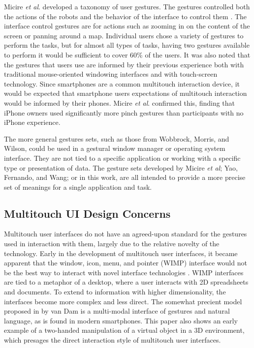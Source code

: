 Micire \textit{et al}. developed a taxonomy of user gestures. 
The gestures controlled both the actions of the robots and the behavior of the interface to control them \citep{Micire:2009:ANG:1731903.1731912}. 
The interface control gestures are for actions such as zooming in on the content of the screen or panning around a map. 
Individual users chose a variety of gestures to perform the tasks, but for almost all types of tasks, having two gestures available to perform it would be sufficient to cover 60\% of the users. 
It was also noted that the gestures that users use are informed by their previous experience both with traditional mouse-oriented windowing interfaces and with touch-screen technology. 
Since smartphones are a common multitouch interaction device, it would be expected that smartphone users expectations of multitouch interaction would be informed by their phones. 
Micire \textit{et al}. confirmed this, finding that iPhone owners used significantly more pinch gestures than participants with no iPhone experience. 

The more general gestures sets, such as those from Wobbrock, Morris, and Wilson, could be used in a gestural window manager or operating system interface. 
They are not tied to a specific application or working with a specific type or presentation of data.
The gesture sets developed by Micire \textit{et al}; Yao, Fernando, and Wang; or in this work, are all intended to provide a more precise set of meanings for a single application and task. 


\subsection{Multitouch UI Design Concerns} \label{section:Multitouch_UI_Design_Concerns}
Multitouch user interfaces do not have an agreed-upon standard for the gestures used in interaction with them, largely due to the relative novelty of the technology. 
Early in the development of multitouch user interfaces, it became apparent that the window, icon, menu, and pointer (WIMP) interface would not be the best way to interact with novel interface technologies \citep{van1997post}. 
WIMP interfaces are tied to a metaphor of a desktop, where a user interacts with 2D spreadsheets and documents. 
To extend to information with higher dimensionality, the interfaces become more complex and less direct. 
The somewhat precient model proposed in by van Dam is a multi-modal interface of gestures and natural language, as is found in modern smartphones. 
This paper also shows an early example of a two-handed manipulation of a virtual object in a 3D environment, which presages the direct interaction style of multitouch user interfaces. 

